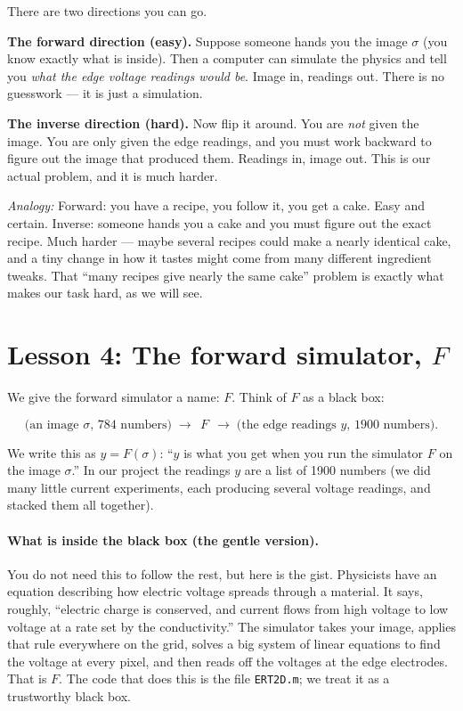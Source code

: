 \documentclass[11pt]{article}
\newcommand{\analogy}[1]{\par\smallskip\noindent\textit{Analogy:} #1\par\smallskip}
\begin{document}
There are two directions you can go.

\textbf{The forward direction (easy).} Suppose someone hands you the image
$\sigma$ (you know exactly what is inside). Then a computer can simulate the
physics and tell you \emph{what the edge voltage readings would be}. Image in,
readings out. There is no guesswork --- it is just a simulation.

\textbf{The inverse direction (hard).} Now flip it around. You are \emph{not}
given the image. You are only given the edge readings, and you must work
backward to figure out the image that produced them. Readings in, image out.
This is our actual problem, and it is much harder.

\analogy{Forward: you have a recipe, you follow it, you get a cake. Easy and
certain. Inverse: someone hands you a cake and you must figure out the exact
recipe. Much harder --- maybe several recipes could make a nearly identical
cake, and a tiny change in how it tastes might come from many different
ingredient tweaks. That ``many recipes give nearly the same cake'' problem is
exactly what makes our task hard, as we will see.}

\section{Lesson 4: The forward simulator, $F$}

We give the forward simulator a name: $F$. Think of $F$ as a black box:

\[
\text{(an image $\sigma$, 784 numbers)} \;\longrightarrow\; \boxed{\,F\,}
\;\longrightarrow\; \text{(the edge readings $y$, 1900 numbers)} .
\]

We write this as $y = F(\sigma)$: ``$y$ is what you get when you run the
simulator $F$ on the image $\sigma$.'' In our project the readings $y$ are a
list of 1900 numbers (we did many little current experiments, each producing
several voltage readings, and stacked them all together).

\paragraph{What is inside the black box (the gentle version).} You do not need
this to follow the rest, but here is the gist. Physicists have an equation
describing how electric voltage spreads through a material. It says, roughly,
``electric charge is conserved, and current flows from high voltage to low
voltage at a rate set by the conductivity.'' The simulator takes your image,
applies that rule everywhere on the grid, solves a big system of linear
equations to find the voltage at every pixel, and then reads off the voltages
at the edge electrodes. That is $F$. The code that does this is the file
\texttt{ERT2D.m}; we treat it as a trustworthy black box.
\end{document}
